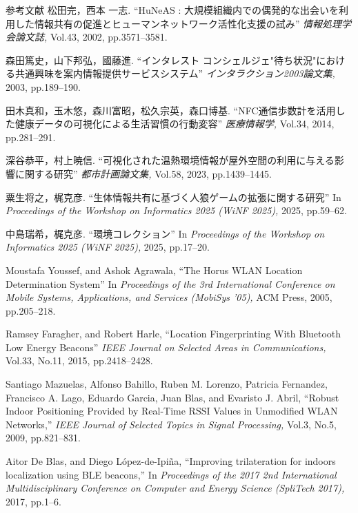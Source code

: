 \begin{thebibliography}{参考文献}
  松田完，西本 一志.
  ``HuNeAS : 大規模組織内での偶発的な出会いを利用した情報共有の促進とヒューマンネットワーク活性化支援の試み''
  {\sl 情報処理学会論文誌,}
  Vol.43,
  2002,
  pp.3571--3581.

  森田篤史，山下邦弘，國藤進.
  ``インタレスト コンシェルジェ"待ち状況"における共通興味を案内情報提供サービスシステム''
  {\sl インタラクション2003論文集,}
  2003,
  pp.189--190.

  田木真和，玉木悠，森川富昭，松久宗英，森口博基.
  ``NFC通信歩数計を活用した健康データの可視化による生活習慣の行動変容''
  {\sl 医療情報学,}
  Vol.34,
  2014,
  pp.281--291.

  深谷恭平，村上暁信.
  ``可視化された温熱環境情報が屋外空間の利用に与える影響に関する研究''
  {\sl 都市計画論文集,}
  Vol.58,
  2023,
  pp.1439--1445.

  粟生将之，梶克彦.
  ``生体情報共有に基づく人狼ゲームの拡張に関する研究''
  In {\sl Proceedings of the Workshop on Informatics 2025 (WiNF 2025),}
  2025,
  pp.59--62.

  中島瑞希，梶克彦.
  ``環境コレクション''
  In {\sl Proceedings of the Workshop on Informatics 2025 (WiNF 2025),}
  2025,
  pp.17--20.


  Moustafa Youssef, and Ashok Agrawala,
  ``The Horus WLAN Location Determination System''
  In {\sl Proceedings of the 3rd International Conference on Mobile Systems, Applications, and Services (MobiSys '05),}
  ACM Press,
  2005,
  pp.205--218.

  Ramsey Faragher, and Robert Harle,
  ``Location Fingerprinting With Bluetooth Low Energy Beacons''
  {\sl IEEE Journal on Selected Areas in Communications,}
  Vol.33,
  No.11,
  2015,
  pp.2418--2428.

  Santiago Mazuelas, Alfonso Bahillo, Ruben M. Lorenzo, Patricia Fernandez, Francisco A. Lago, Eduardo Garcia, Juan Blas, and Evaristo J. Abril,
  ``Robust Indoor Positioning Provided by Real-Time RSSI Values in Unmodified WLAN Networks,''
  {\sl IEEE Journal of Selected Topics in Signal Processing,}
  Vol.3,
  No.5,
  2009,
  pp.821--831.

  Aitor De Blas, and Diego López-de-Ipiña,
  ``Improving trilateration for indoors localization using BLE beacons,''
  In {\sl Proceedings of the 2017 2nd International Multidisciplinary Conference on Computer and Energy Science (SpliTech 2017),}
  2017,
  pp.1--6.



\end{thebibliography}
